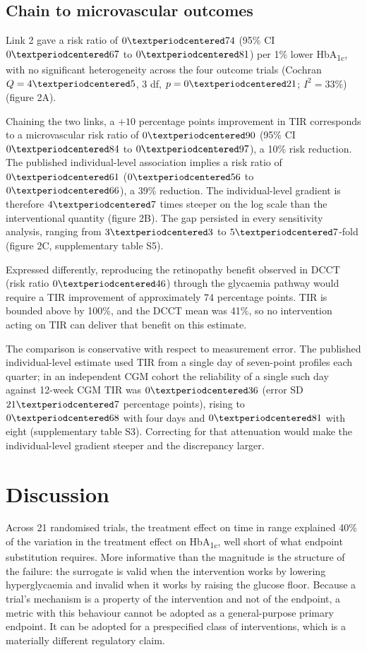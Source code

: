 \documentclass[11pt,a4paper]{article}
\newcommand{\pp}{percentage points}
\begin{document}
\subsection{Chain to microvascular outcomes}
Link 2 gave a risk ratio of $0\textperiodcentered74$ (95\% CI $0\textperiodcentered67$ to
$0\textperiodcentered81$) per 1\% lower HbA\textsubscript{1c}, with no significant heterogeneity across the
four outcome trials (Cochran $Q = 4\textperiodcentered5$, 3 df, $p = 0\textperiodcentered21$;
$I^2 = 33$\%) (figure 2A).

Chaining the two links, a $+10$ \pp{} improvement in TIR corresponds to a microvascular risk ratio of
$0\textperiodcentered90$ (95\% CI $0\textperiodcentered84$ to $0\textperiodcentered97$), a 10\% risk
reduction. The published individual-level association\citep{beck2019tir} implies a risk ratio of
$0\textperiodcentered61$
($0\textperiodcentered56$ to $0\textperiodcentered66$), a 39\% reduction. The individual-level gradient is
therefore $4\textperiodcentered7$ times steeper on the log scale than the interventional quantity
(figure 2B). The gap persisted in every sensitivity analysis, ranging from $3\textperiodcentered3$ to
$5\textperiodcentered7$-fold (figure 2C, supplementary table S5).

Expressed differently, reproducing the retinopathy benefit observed in DCCT\citep{dcct1993} (risk ratio
$0\textperiodcentered46$) through the glycaemia pathway would require a TIR improvement of approximately
74 \pp. TIR is bounded above by 100\%, and the DCCT mean was 41\%, so no intervention acting on TIR can
deliver that benefit on this estimate.

The comparison is conservative with respect to measurement error. The published individual-level estimate
used TIR from a single day of seven-point profiles each quarter; in an independent CGM cohort the
reliability of a single such day against 12-week CGM TIR was $0\textperiodcentered36$ (error SD
$21\textperiodcentered7$ \pp), rising to $0\textperiodcentered68$ with four days and
$0\textperiodcentered81$ with eight (supplementary table S3). Correcting for that attenuation would make the
individual-level gradient steeper and the discrepancy larger.

\section{Discussion}

Across 21 randomised trials, the treatment effect on time in range explained 40\% of the variation in the
treatment effect on HbA\textsubscript{1c}, well short of what endpoint substitution requires. More
informative than the magnitude is the structure of the failure: the surrogate is valid when the intervention
works by lowering hyperglycaemia and invalid when it works by raising the glucose floor. Because a trial's
mechanism is a property of the intervention and not of the endpoint, a metric with this behaviour cannot be
adopted as a general-purpose primary endpoint. It can be adopted for a prespecified class of interventions,
which is a materially different regulatory claim.
\end{document}
